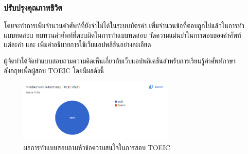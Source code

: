 \documentclass[12pt,oneside,openright,a4paper]{cpe-thai-project}
\begin{document}
\subsubsection{ปรับปรุงคุณภาพชีวิต}
\hspace{1cm}
โดยจะทำการเพิ่มจำนวนคำศัพท์ที่ยังจำไม่ได้ในระบบบัตรคำ เพิ่มจำนวนข้อที่ตอบถูกไปแล้วในการทำแบบทดสอบ
ทบทวนคำศัพท์ที่ตอบผิดในการทำแบบทดสอบ วัดความแม่นยำในการตอบของคำศัพท์แต่ละคำ และ
เพิ่มคำอธิบายการใช้เว็บแอปพลิชันอย่างละเอียด



\makeatletter
\g@addto@macro{\UrlBreaks}{\UrlOrds}
\makeatother
% 





ผู้จัดทำได้จัดทำแบบสอบถามความคิดเห็นเกี่ยวกับเว็บแอปพลิเคชันสำหรับการเรียนรู้คำศัพท์ภาษาอังกฤษเพื่อผู้สอบ TOEIC โดยมีผลดังนี้

\begin{figure}[!h]\centering
	\includegraphics[width=0.7\textwidth, keepaspectratio=true]{image/appendix/1st/toeic interest.png}
	\caption{{ผลการทำแบบสอบถามหัวข้อความสนใจในการสอบ TOEIC}}\label{fig:apdxTOEICInterest}
\end{figure}
\end{document}
